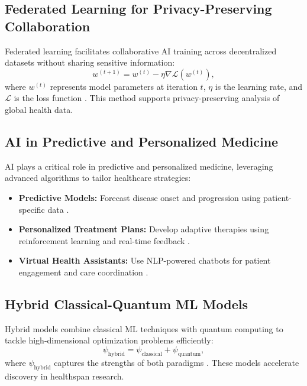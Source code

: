 \documentclass{article}
\theoremstyle{plain}
\begin{document}
\subsection{Federated Learning for Privacy-Preserving Collaboration}
Federated learning facilitates collaborative AI training across decentralized datasets without sharing sensitive information:
\begin{equation}
w^{(t+1)} = w^{(t)} - \eta \nabla \mathcal{L}(w^{(t)}),
\end{equation}
where $w^{(t)}$ represents model parameters at iteration $t$, $\eta$ is the learning rate, and $\mathcal{L}$ is the loss function \cite{federatedLearning2023}. This method supports privacy-preserving analysis of global health data.

\subsection{AI in Predictive and Personalized Medicine}
AI plays a critical role in predictive and personalized medicine, leveraging advanced algorithms to tailor healthcare strategies:
\begin{itemize}
    \item \textbf{Predictive Models:} Forecast disease onset and progression using patient-specific data \cite{predictiveAI2023}.
    \item \textbf{Personalized Treatment Plans:} Develop adaptive therapies using reinforcement learning and real-time feedback \cite{personalizedAI2022}.
    \item \textbf{Virtual Health Assistants:} Use NLP-powered chatbots for patient engagement and care coordination \cite{nlpHealthcare2023}.
\end{itemize}

\subsection{Hybrid Classical-Quantum ML Models}
Hybrid models combine classical ML techniques with quantum computing to tackle high-dimensional optimization problems efficiently:
\begin{equation}
\psi_{\text{hybrid}} = \psi_{\text{classical}} + \psi_{\text{quantum}},
\end{equation}
where $\psi_{\text{hybrid}}$ captures the strengths of both paradigms \cite{quantumML2023}. These models accelerate discovery in healthspan research.
\end{document}
